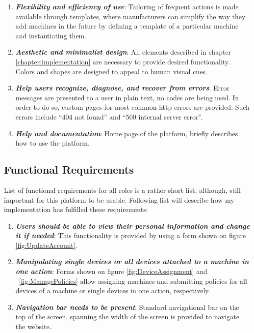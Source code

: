 \begin{enumerate}
	\item \textbf{\textit{Flexibility and efficiency of use}}: Tailoring of frequent actions is made available through templates, where manufacturers can simplify the way they add machines in the future by defining a template of a particular machine and instantiating them.

	\item \textbf{\textit{Aesthetic and minimalist design}}: All elements described in chapter \ref{chapter:implementation} are necessary to provide desired functionality. Colors and shapes are designed to appeal to human visual cues.

	\item \textbf{\textit{Help users recognize, diagnose, and recover from errors}}: Error messages are presented to a user in plain text, no codes are being used. In order to do so, custom pages for most common http errors are provided. Such errors include ``404 not found'' and ``500 internal server error''.

	\item \textbf{\textit{Help and documentation}}: Home page of the platform, briefly describes how to use the platform.
\end{enumerate}

\subsection{Functional Requirements}

List of functional requirements for all roles is a rather short list, although, still important for this platform to be usable. Following list will describe how my implementation has fulfilled these requirements:

\begin{enumerate}
	\setlength{\itemsep}{1pt}
	\item \textbf{\textit{Users should be able to view their personal information and change it if needed}}: This functionality is provided by using a form shown on figure \ref{fig:UpdateAccount}.
	\item \textbf{\textit{Manipulating single devices or all devices attached to a machine in one action}}: Forms shown on figure \ref{fig:DeviceAssignment} and ~\ref{fig:ManagePolicies} allow assigning machines and submitting policies for all devices of a machine or single devices in one action, respectively.
	\item \textbf{\textit{Navigation bar needs to be present}}: Standard navigational bar on the top of the screen, spanning the width of the screen is provided to navigate the website.
\end{enumerate} 

